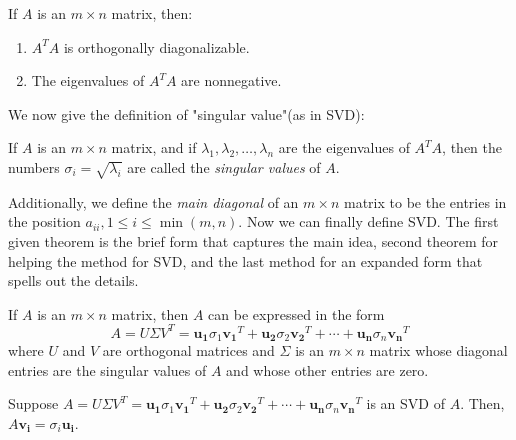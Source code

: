 \documentclass{report}
\begin{document}
		\begin{thm}
			If $A$ is an $m \times n$ matrix, then:
			\begin{enumerate}
				\item $A^TA$ is orthogonally diagonalizable.
				\item The eigenvalues of $A^TA$ are nonnegative.
			\end{enumerate}
		\end{thm}
		
		We now give the definition of "singular value"(as in SVD):
		
		\begin{defn}
			If $A$ is an $m \times n$ matrix, and if $\lambda_1, \lambda_2, \dots, \lambda_n$ are the eigenvalues of $A^TA$, then the numbers $\sigma_i=\sqrt{\lambda_i}$ are called the \emph{singular values} of $A$.
		\end{defn}
		
		Additionally, we define the \emph{main diagonal} of an $m \times n$ matrix to be the entries in the position $a_{ii}, 1 \le i \le \min(m,n)$. Now we can finally define SVD. The first given theorem is the brief form that captures the main idea, second theorem for helping the method for SVD, and the last method for an expanded form that spells out the details.
		
		\begin{thm}
			If $A$ is an $m \times n$ matrix, then $A$ can be expressed in the form
			\begin{displaymath}
				A=U\Sigma V^T=\bm{u_1}\sigma_1\bm{v_1}^T+\bm{u_2}\sigma_2\bm{v_2}^T+\cdots+\bm{u_n}\sigma_n\bm{v_n}^T
			\end{displaymath}
			where $U$ and $V$ are orthogonal matrices and $\Sigma$ is an $m \times n$ matrix whose diagonal entries are the singular values of $A$ and whose other entries are zero.
		\end{thm}
		
		\begin{thm}
			Suppose $A=U\Sigma V^T=\bm{u_1}\sigma_1\bm{v_1}^T+\bm{u_2}\sigma_2\bm{v_2}^T+\cdots+\bm{u_n}\sigma_n\bm{v_n}^T$ is an SVD of $A$. Then, $A\bm{v_i}=\sigma_i\bm{u_i}$.
		\end{thm}
		
\end{document}
